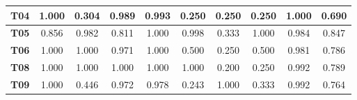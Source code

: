 \begin{table}[htbp]
\begin{tabular}{|c|cccccccc|c|}
		\textbf{T04}                                             & \multicolumn{1}{c|}{1.000}                                & \multicolumn{1}{c|}{0.304}                                & \multicolumn{1}{c|}{0.989}                                & \multicolumn{1}{c|}{0.993}                                & \multicolumn{1}{c|}{0.250}                                & \multicolumn{1}{c|}{0.250}                                & \multicolumn{1}{c|}{0.250}                                & 1.000        & 0.690                                                 \\ \hline
		\rowcolor[HTML]{F2F2F2} 
		\textbf{T05}                                             & \multicolumn{1}{c|}{\cellcolor[HTML]{F2F2F2}0.856}        & \multicolumn{1}{c|}{\cellcolor[HTML]{F2F2F2}0.982}        & \multicolumn{1}{c|}{\cellcolor[HTML]{F2F2F2}0.811}        & \multicolumn{1}{c|}{\cellcolor[HTML]{F2F2F2}1.000}        & \multicolumn{1}{c|}{\cellcolor[HTML]{F2F2F2}0.998}        & \multicolumn{1}{c|}{\cellcolor[HTML]{F2F2F2}0.333}        & \multicolumn{1}{c|}{\cellcolor[HTML]{F2F2F2}1.000}        & 0.984        & 0.847                                                 \\ \hline
		\textbf{T06}                                             & \multicolumn{1}{c|}{1.000}                                & \multicolumn{1}{c|}{1.000}                                & \multicolumn{1}{c|}{0.971}                                & \multicolumn{1}{c|}{1.000}                                & \multicolumn{1}{c|}{0.500}                                & \multicolumn{1}{c|}{0.250}                                & \multicolumn{1}{c|}{0.500}                                & 0.981        & 0.786                                                 \\ \hline
		\rowcolor[HTML]{F2F2F2} 
		\textbf{T08}                                             & \multicolumn{1}{c|}{\cellcolor[HTML]{F2F2F2}1.000}        & \multicolumn{1}{c|}{\cellcolor[HTML]{F2F2F2}1.000}        & \multicolumn{1}{c|}{\cellcolor[HTML]{F2F2F2}1.000}        & \multicolumn{1}{c|}{\cellcolor[HTML]{F2F2F2}1.000}        & \multicolumn{1}{c|}{\cellcolor[HTML]{F2F2F2}1.000}        & \multicolumn{1}{c|}{\cellcolor[HTML]{F2F2F2}0.200}        & \multicolumn{1}{c|}{\cellcolor[HTML]{F2F2F2}0.250}        & 0.992        & 0.789                                                 \\ \hline
		\textbf{T09}                                             & \multicolumn{1}{c|}{1.000}                                & \multicolumn{1}{c|}{0.446}                                & \multicolumn{1}{c|}{0.972}                                & \multicolumn{1}{c|}{0.978}                                & \multicolumn{1}{c|}{0.243}                                & \multicolumn{1}{c|}{1.000}                                & \multicolumn{1}{c|}{0.333}                                & 0.992        & 0.764                                                 \\ \hline

\end{tabular}
\end{table}
